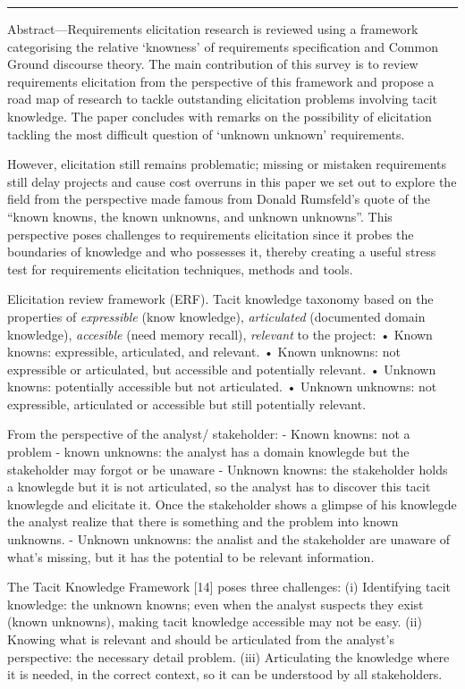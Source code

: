 \documentclass[]{llncs}
\begin{document}
\begin{center}\rule{0.5\linewidth}{\linethickness}\end{center}

Abstract---Requirements elicitation research is reviewed using a
framework categorising the relative `knowness' of requirements
specification and Common Ground discourse theory. The main contribution
of this survey is to review requirements elicitation from the
perspective of this framework and propose a road map of research to
tackle outstanding elicitation problems involving tacit knowledge. The
paper concludes with remarks on the possibility of elicitation tackling
the most difficult question of `unknown unknown' requirements.

However, elicitation still remains problematic; missing or mistaken
requirements still delay projects and cause cost overruns in this paper
we set out to explore the field from the perspective made famous from
Donald Rumsfeld's quote of the ``known knowns, the known unknowns, and
unknown unknowns''. This perspective poses challenges to requirements
elicitation since it probes the boundaries of knowledge and who
possesses it, thereby creating a useful stress test for requirements
elicitation techniques, methods and tools.

Elicitation review framework (ERF). Tacit knowledge taxonomy based on
the properties of \emph{expressible} (know knowledge),
\emph{articulated} (documented domain knowledge), \emph{accesible} (need
memory recall), \emph{relevant} to the project: • Known knowns:
expressible, articulated, and relevant. • Known unknowns: not
expressible or articulated, but accessible and potentially relevant. •
Unknown knowns: potentially accessible but not articulated. • Unknown
unknowns: not expressible, articulated or accessible but still
potentially relevant.

From the perspective of the analyst/ stakeholder: - Known knowns: not a
problem - known unknowns: the analyst has a domain knowlegde but the
stakeholder may forgot or be unaware - Unknown knowns: the stakeholder
holds a knowlegde but it is not articulated, so the analyst has to
discover this tacit knowlegde and elicitate it. Once the stakeholder
shows a glimpse of his knowlegde the analyst realize that there is
something and the problem into known unknowns. - Unknown unknowns: the
analist and the stakeholder are unaware of what's missing, but it has
the potential to be relevant information.

The Tacit Knowledge Framework {[}14{]} poses three challenges: (i)
Identifying tacit knowledge: the unknown knowns; even when the analyst
suspects they exist (known unknowns), making tacit knowledge accessible
may not be easy. (ii) Knowing what is relevant and should be articulated
from the analyst's perspective: the necessary detail problem. (iii)
Articulating the knowledge where it is needed, in the correct context,
so it can be understood by all stakeholders.
\end{document}
